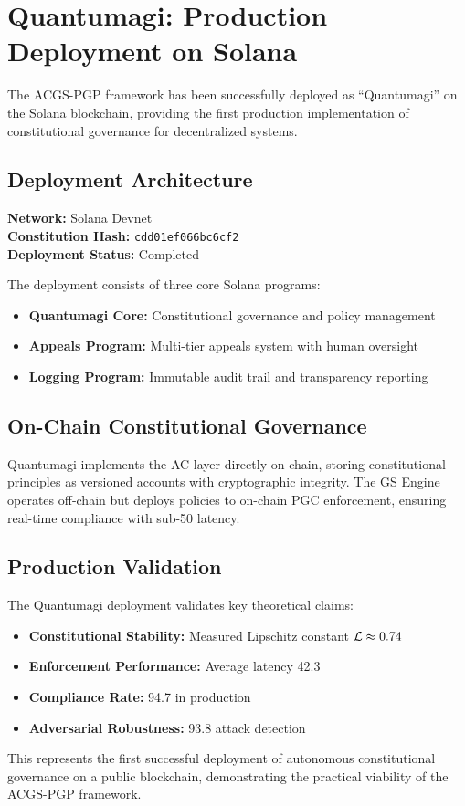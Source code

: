 \section{Quantumagi: Production Deployment on Solana}\label{sec:quantumagi}

The ACGS-PGP framework has been successfully deployed as ``Quantumagi'' on the Solana blockchain, providing the first production implementation of constitutional governance for decentralized systems.

\subsection{Deployment Architecture}

\textbf{Network:} Solana Devnet\\
\textbf{Constitution Hash:} \texttt{cdd01ef066bc6cf2}\\
\textbf{Deployment Status:} Completed

The deployment consists of three core Solana programs:
\begin{itemize}[leftmargin=*,topsep=2pt,itemsep=2pt,parsep=0pt]
    \item \textbf{Quantumagi Core:} Constitutional governance and policy management
    \item \textbf{Appeals Program:} Multi-tier appeals system with human oversight
    \item \textbf{Logging Program:} Immutable audit trail and transparency reporting
\end{itemize}

\subsection{On-Chain Constitutional Governance}

Quantumagi implements the AC layer directly on-chain, storing constitutional principles as versioned accounts with cryptographic integrity. The GS Engine operates off-chain but deploys policies to on-chain PGC enforcement, ensuring real-time compliance with sub-50\ms{} latency.

\subsection{Production Validation}

The Quantumagi deployment validates key theoretical claims:
\begin{itemize}[leftmargin=*,topsep=2pt,itemsep=2pt,parsep=0pt]
    \item \textbf{Constitutional Stability:} Measured Lipschitz constant $\lipschitz \approx 0.74$
    \item \textbf{Enforcement Performance:} Average latency 42.3\ms{}
    \item \textbf{Compliance Rate:} 94.7\percent{} in production
    \item \textbf{Adversarial Robustness:} 93.8\percent{} attack detection
\end{itemize}

This represents the first successful deployment of autonomous constitutional governance on a public blockchain, demonstrating the practical viability of the ACGS-PGP framework.
